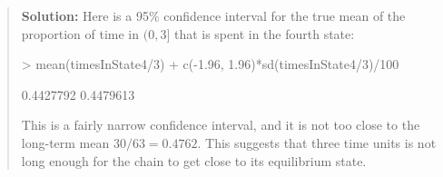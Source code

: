 \documentclass{article}
\begin{document}
\begin{enumerate}
\begin{enumerate}
\begin{quotation}{\bf Solution:}
    Here is a 95\% confidence interval for the true mean of the proportion of time 
    in $(0,3]$ that is spent in the fourth state:
\begin{Schunk}
\begin{Sinput}
> mean(timesInState4/3) + c(-1.96, 1.96)*sd(timesInState4/3)/100
\end{Sinput}
\begin{Soutput}
[1] 0.4427792 0.4479613
\end{Soutput}
\end{Schunk}
   This is a fairly narrow confidence interval, and it is not too close to the long-term mean
   $30/63=0.4762$.  This suggests that three time units is not long enough for the chain
   to get close to its equilibrium state.  
    \end{quotation}

    \end{enumerate}

\end{enumerate}
\end{document}
